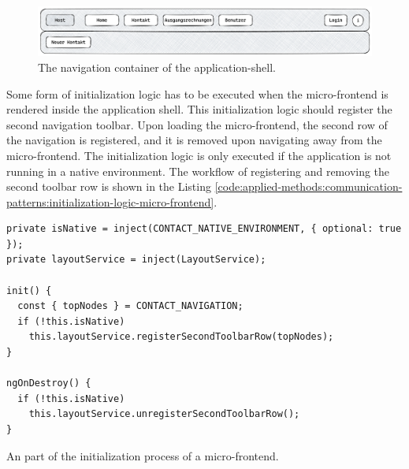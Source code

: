\ifshowImages
  \begin{figure}[H]
  \centering
  \includegraphics[width=1\linewidth]{images/applied-methods/communication-patterns/host-contact-header.png}
  \caption{The navigation container of the application-shell.}\label{fig:applied-methods:communication-patterns:application-shell-header}
  \end{figure}
\fi

\noindent Some form of initialization logic has to be executed when the micro-frontend is rendered inside the application shell. This initialization logic should register the second navigation toolbar. Upon loading the micro-frontend, the second row of the navigation is registered, and it is removed upon navigating away from the micro-frontend. The initialization logic is only executed if the application is not running in a native environment. The workflow of registering and removing the second toolbar row is shown in the Listing \ref{code:applied-methods:communication-patterns:initialization-logic-micro-frontend}.

\ifshowListings
  \begin{listing}[H]
  \begin{verbatim}
private isNative = inject(CONTACT_NATIVE_ENVIRONMENT, { optional: true });
private layoutService = inject(LayoutService);

init() {
  const { topNodes } = CONTACT_NAVIGATION;
  if (!this.isNative)
    this.layoutService.registerSecondToolbarRow(topNodes);
}

ngOnDestroy() {
  if (!this.isNative)
    this.layoutService.unregisterSecondToolbarRow();
}
  \end{verbatim}
  \caption{An part of the initialization process of a micro-frontend.}\label{code:applied-methods:communication-patterns:initialization-logic-micro-frontend}
  \end{listing}
\fi

